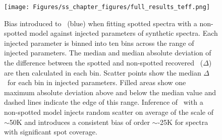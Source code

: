 \begin{figure}
    \texttt{[image: Figures/ss\_chapter\_figures/full\_results\_teff.png]}
    \caption{Bias introduced to \teff\ (blue) when fitting spotted spectra with a non-spotted model against injected parameters of synthetic spectra. Each injected parameter is binned into ten bins across the range of injected parameters. The median and median absolute deviation of the difference between the spotted and non-spotted recovered \teff\ ($\Delta$\teff) are then calculated in each bin.
    Scatter points show the median $\Delta$\teff\ for each bin in injected parameters. Filled areas show one maximum absolute deviation above and below the median value and dashed lines indicate the edge of this range.
     Inference of \teff\ with a non-spotted model injects random scatter on average of the scale of $\sim$50K and introduces a consistent bias of order $\sim$-25K for spectra with significant spot coverage.
    }
    \label{fig:res_teff}
\end{figure}

